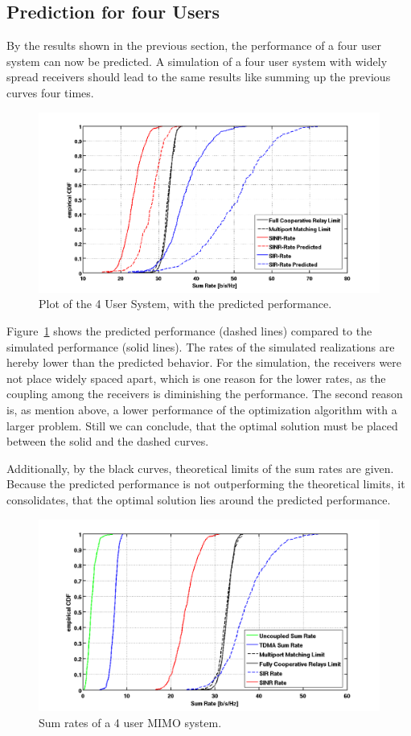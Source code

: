 \subsection{Prediction for four Users}
\label{sec:const_prediction}
By the results shown in the previous section, the performance of a four user system can now be predicted.
A simulation of a four user system with widely spread receivers should lead to the same results like summing up the previous curves four times.
\begin{figure}[h]
\centering
  \includegraphics[width=\linewidth]{images/4user_inklpred.png}
\caption{Plot of the 4 User System, with the predicted performance.}
\label{fig:4user_pred}
\end{figure}

Figure~\ref{fig:4user_pred} shows the predicted performance (dashed lines) compared to the simulated performance (solid lines).
The rates of the simulated realizations are hereby lower than the predicted behavior.
For the simulation, the receivers were not place widely spaced apart, which is one reason for the lower rates, as the coupling among the receivers is diminishing the performance.
The second reason is, as mention above, a lower performance of the optimization algorithm with a larger problem.
Still we can conclude, that the optimal solution must be placed between the solid and the dashed curves.

Additionally, by the black curves, theoretical limits of the sum rates are given.
Because the predicted performance is not outperforming the theoretical limits, it consolidates, that the optimal solution lies around the predicted performance.


\begin{figure}[h]
\centering
  \includegraphics[width=\linewidth]{images/4user_sumrate.png}
\caption{Sum rates of a 4 user MIMO system.}
\label{fig:4user_sumrate}
\end{figure}
